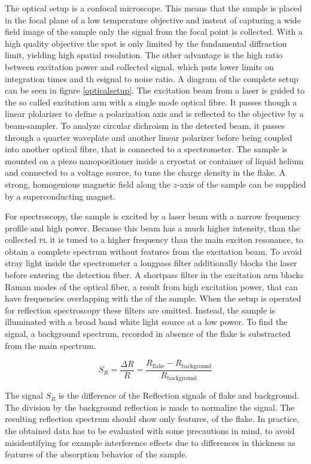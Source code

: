 The optical setup is a confocal microscope. This means that the sample is placed in the focal plane of a low temperature objective and insteat of capturing a wide field image of the sample only the signal from the focal point is collected. With a high quality objective the spot is only limited by the fundamental diffraction limit, yielding high spatial resolution. The other advantage is the high ratio between excitation power and collected signal, which puts lower limits on integration times and th esignal to noise ratio. A diagram of the complete setup can be seen in figure \ref{opticalsetup}. The excitation beam from a laser is guided to the so called excitation arm with a single mode optical fibre. It passes though a linear plolarizer to define a polarization axis and is reflected to the objective by a beam-sampler. To analyze circular dichroism in the detected beam, it passes through a quarter waveplate and another linear polarizer before being coupled into another optical fibre, that is connected to a spectrometer. The sample is mounted on a piezo nanopositioner inside a cryostat or container of liquid helium and connected to a voltage source, to tune the charge density in the \tmdg flake. A strong, homogenious magnetic field along the $z$-axis of the sample can be supplied by a superconducting magnet.

For \pl spectroscopy, the sample is excited by a laser beam with a narrow frequency profile and high power. Because this beam has a much higher intensity, than the collected \textsc{pl} it is tuned to a higher frequency than the main exciton resonance, to obtain a complete spectrum without features from the excitation beam. To avoid stray light inside the spectrometer a longpass filter additionally blocks the laser before entering the detection fiber. A shortpass filter in the excitation arm blocks Raman modes of the optical fiber, a result from high excitation power, that can have frequencies overlapping with the \pl of the sample. 
When the setup is operated for reflection spectroscopy these filters are omitted. Instead, the sample is illuminated with a broad band white light source at a low power. To find the signal, a background spectrum, recorded in absence of the \tmdg flake is substracted from the main spectrum.

\[ 
	S_R = \frac{\Delta R}{R} = \frac{R_{\mathrm{flake}} - R_{\mathrm{background}}}{R_{\mathrm{background}}}
\]

The signal $S_R$ is the difference of the Reflection signals of \tmdg flake and background. The division by the background reflection is made to normalize the signal. The resulting reflection spectrum should show only features, of the flake. In practice, the obtained data has to be evaluated with some precautions in mind, to avoid misidentifying for example interference effects due to differences in \hbng thickness as features of the absorption behavior of the sample.

